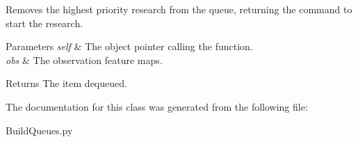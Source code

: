 Removes the highest \textquotesingle{}priority\textquotesingle{} research from the queue, returning the command to start the research. 


\begin{DoxyParams}{Parameters}
{\em self} & The object pointer calling the function. \\
\hline
{\em obs} & The observation feature maps. \\
\hline
\end{DoxyParams}
\begin{DoxyReturn}{Returns}
The item dequeue\textquotesingle{}d. 
\end{DoxyReturn}


The documentation for this class was generated from the following file\+:\begin{DoxyCompactItemize}
\item 
Build\+Queues.\+py\end{DoxyCompactItemize}
